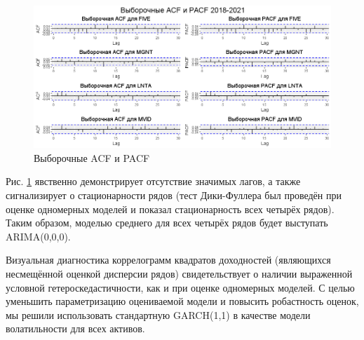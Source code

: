 \documentclass[a4paper,12pt,twoside]{article}
\begin{document}
\begin{figure}[h]
    \includegraphics[scale = 0.45]{dcc_acf_pacf.png}
    \caption{Выборочные ACF и PACF}
    \label{fig:acfpacf}
\end{figure}

Рис. \ref{fig:acfpacf} явственно демонстрирует отсутствие значимых лагов, а также сигнализирует о стационарности рядов (тест Дики-Фуллера был проведён при оценке одномерных моделей и показал стационарность всех четырёх рядов). Таким образом, моделью среднего для всех четырёх рядов будет выступать ARIMA(0,0,0).

Визуальная диагностика коррелограмм квадратов доходностей (являющихся несмещённой оценкой дисперсии рядов) свидетельствует о наличии выраженной условной гетероскедастичности, как и при оценке одномерных моделей. С целью уменьшить параметризацию оцениваемой модели и повысить робастность оценок, мы решили использовать стандартную GARCH(1,1) в качестве модели волатильности для всех активов.
\end{document}
